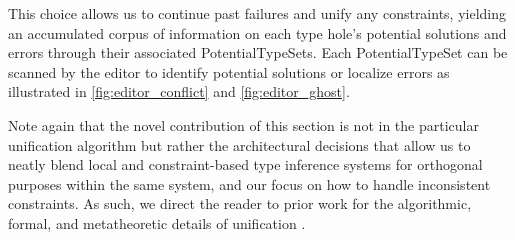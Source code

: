 This choice allows us to continue past failures and unify any constraints, yielding an accumulated corpus of information on each type hole’s potential solutions and errors through their associated \textsf{PotentialTypeSet}s. Each \textsf{PotentialTypeSet} can be scanned by the editor to identify potential solutions or localize errors as illustrated in \cref{fig:editor_conflict} and \cref{fig:editor_ghost}. 

Note again that the novel contribution of this section is not in the particular unification algorithm but rather the architectural decisions that allow us to neatly blend local and constraint-based type inference systems for orthogonal purposes within the same system, and our focus on how to handle inconsistent constraints. As such, we direct the reader to prior work for the algorithmic, formal, and metatheoretic details of unification \cite{GradualInfer}.




